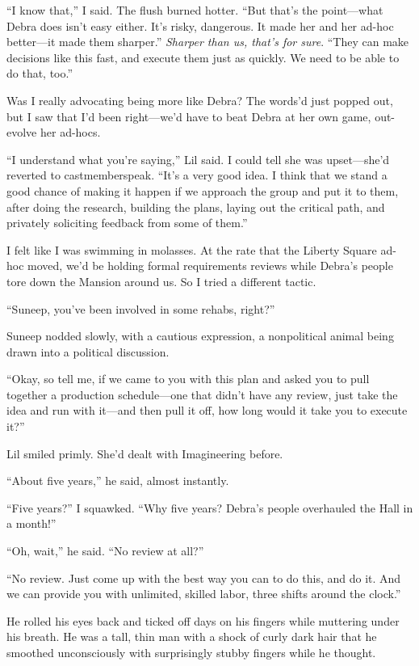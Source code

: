 “I know that,” I said. The flush burned hotter. “But that's the
point—what Debra does isn't easy either. It's risky, dangerous. It
made her and her ad-hoc better—it made them sharper.”
\emph{Sharper than us, that's for sure}. “They can make decisions
like this fast, and execute them just as quickly. We need to be
able to do that, too.”

Was I really advocating being more like Debra? The words'd just
popped out, but I saw that I'd been right—we'd have to beat Debra
at her own game, out-evolve her ad-hocs.

“I understand what you're saying,” Lil said. I could tell she was
upset—she'd reverted to castmemberspeak. “It's a very good idea. I
think that we stand a good chance of making it happen if we
approach the group and put it to them, after doing the research,
building the plans, laying out the critical path, and privately
soliciting feedback from some of them.”

I felt like I was swimming in molasses. At the rate that the
Liberty Square ad-hoc moved, we'd be holding formal requirements
reviews while Debra's people tore down the Mansion around us. So I
tried a different tactic.

“Suneep, you've been involved in some rehabs, right?”

Suneep nodded slowly, with a cautious expression, a nonpolitical
animal being drawn into a political discussion.

“Okay, so tell me, if we came to you with this plan and asked you
to pull together a production schedule—one that didn't have any
review, just take the idea and run with it—and then pull it off,
how long would it take you to execute it?”

Lil smiled primly. She'd dealt with Imagineering before.

“About five years,” he said, almost instantly.

“Five years?” I squawked. “Why five years? Debra's people
overhauled the Hall in a month!”

“Oh, wait,” he said. “No review at all?”

“No review. Just come up with the best way you can to do this, and
do it. And we can provide you with unlimited, skilled labor, three
shifts around the clock.”

He rolled his eyes back and ticked off days on his fingers while
muttering under his breath. He was a tall, thin man with a shock of
curly dark hair that he smoothed unconsciously with surprisingly
stubby fingers while he thought.

